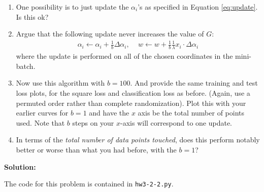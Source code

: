 \documentclass{article}
\newcommand{\solution}{\textbf{\vskip 0.2cm \large Solution:\\}}
\begin{document}
\begin{enumerate}
	\item One possibility is to just update the $\alpha_i$'s as specified in Equation \eqref{eq:update}. Is this ok?
	\item Argue that the following update never increases the value of $G$:
	\begin{align}
		\alpha_i \leftarrow \alpha_i+\frac{1}{b}\Delta\alpha_i, \, \quad w \leftarrow
		w+\frac{1}{b}\frac{1}{\lambda}x_i \cdot \Delta\alpha_i
	\end{align}
	where the update is performed on all of the chosen coordinates in the mini-batch.
	\item  Now use this algorithm with $b=100$. And provide the same training and test loss plots, for the square loss and classification loss as before. (Again, use a permuted order rather than complete randomization). Plot this with your earlier curves for $b=1$ and have the $x$ axis be the total number of points used. Note that $b$ steps on your $x$-axis will correspond to one update.
	\item In terms of the \emph{total number of data points touched}, does this perform notably better or worse than what you had before, with the $b=1$?
\end{enumerate}

\solution

The code for this problem is contained in {\tt hw3-2-2.py}.
\end{document}
